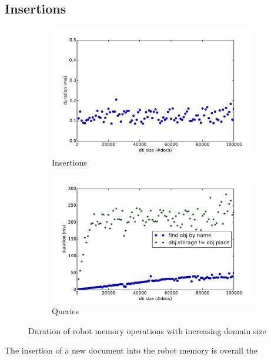 \subsection{Insertions}
\label{sec:insertions}
\begin{figure}
  \centering
  \begin{subfigure}[b]{0.49\textwidth}
    \includegraphics[width=\textwidth]{plots/insert-durations}
    \caption{Insertions}
    \label{fig:insert-durations}
  \end{subfigure}
  \begin{subfigure}[b]{0.49\textwidth}
    \includegraphics[width=\textwidth]{plots/query-durations}
    \caption{Queries}
    \label{fig:query-durations}
  \end{subfigure}
  \caption[Duration of robot memory operations with increasing domain size]{Duration of robot memory operations with increasing domain size}
  \label{fig:eval-durations-1}
\end{figure}
The insertion of a new document into the robot memory is overall the
